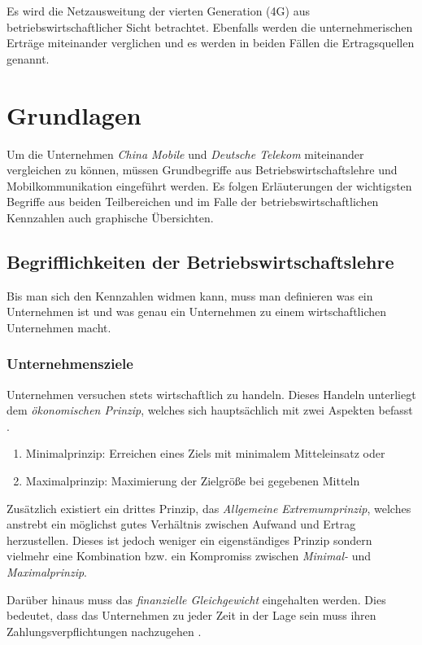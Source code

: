 Es wird die Netzausweitung der vierten Generation (4G) aus betriebswirtschaftlicher Sicht betrachtet. Ebenfalls werden die unternehmerischen Erträge miteinander verglichen und es werden in beiden Fällen die Ertragsquellen genannt.

\section{Grundlagen}
Um die Unternehmen \textit{China Mobile} und \textit{Deutsche Telekom} miteinander vergleichen zu können, müssen Grundbegriffe aus Betriebswirtschaftslehre und Mobilkommunikation eingeführt werden. Es folgen Erläuterungen der wichtigsten Begriffe aus beiden Teilbereichen und im Falle der betriebswirtschaftlichen Kennzahlen auch graphische Übersichten. 

\subsection{Begrifflichkeiten der Betriebswirtschaftslehre}
Bis man sich den Kennzahlen widmen kann, muss man definieren was ein Unternehmen ist und was genau ein Unternehmen zu einem wirtschaftlichen Unternehmen macht.

\subsubsection{Unternehmensziele}

Unternehmen versuchen stets wirtschaftlich zu handeln. Dieses Handeln unterliegt dem \textit{ökonomischen Prinzip}, welches sich hauptsächlich mit zwei Aspekten befasst \cite{muller}.

\begin{enumerate}
\item Minimalprinzip: Erreichen eines Ziels mit minimalem Mitteleinsatz oder
\item Maximalprinzip: Maximierung der Zielgröße bei gegebenen Mitteln
\end{enumerate}

Zusätzlich existiert ein drittes Prinzip, das \textit{Allgemeine Extremumprinzip}, welches anstrebt ein möglichst gutes Verhältnis zwischen Aufwand und Ertrag herzustellen. Dieses ist jedoch weniger ein eigenständiges Prinzip sondern vielmehr eine Kombination bzw. ein Kompromiss zwischen  \textit{Minimal-} und \textit{Maximalprinzip}. 

Darüber hinaus muss das \textit{finanzielle Gleichgewicht} eingehalten werden. Dies bedeutet, dass das Unternehmen zu jeder Zeit in der Lage sein muss ihren Zahlungsverpflichtungen nachzugehen \cite{muller}.

